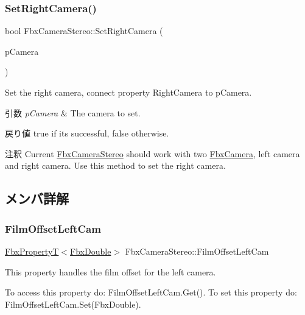 \subsubsection{\texorpdfstring{Set\+Right\+Camera()}{SetRightCamera()}}
{\footnotesize\ttfamily bool Fbx\+Camera\+Stereo\+::\+Set\+Right\+Camera (\begin{DoxyParamCaption}\item[{\hyperlink{class_fbx_camera}{Fbx\+Camera} $\ast$}]{p\+Camera }\end{DoxyParamCaption})}

Set the right camera, connect property Right\+Camera to p\+Camera. 
\begin{DoxyParams}{引数}
{\em p\+Camera} & The camera to set. \\
\hline
\end{DoxyParams}
\begin{DoxyReturn}{戻り値}
{\ttfamily true} if it\textquotesingle{}s successful, {\ttfamily false} otherwise. 
\end{DoxyReturn}
\begin{DoxyRemark}{注釈}
Current \hyperlink{class_fbx_camera_stereo}{Fbx\+Camera\+Stereo} should work with two \hyperlink{class_fbx_camera}{Fbx\+Camera}, left camera and right camera. Use this method to set the right camera. 
\end{DoxyRemark}


\subsection{メンバ詳解}
\mbox{\label{class_fbx_camera_stereo_adfb0e61258f415bd4e80d2a74071d2b5}} 
\subsubsection{\texorpdfstring{Film\+Offset\+Left\+Cam}{FilmOffsetLeftCam}}
{\footnotesize\ttfamily \hyperlink{class_fbx_property_t}{Fbx\+PropertyT}$<$\hyperlink{fbxtypes_8h_a171e72a1c46fc15c1a6c9c31948c1c5b}{Fbx\+Double}$>$ Fbx\+Camera\+Stereo\+::\+Film\+Offset\+Left\+Cam}

This property handles the film offset for the left camera.

To access this property do\+: Film\+Offset\+Left\+Cam.\+Get(). To set this property do\+: Film\+Offset\+Left\+Cam.\+Set(\+Fbx\+Double).

